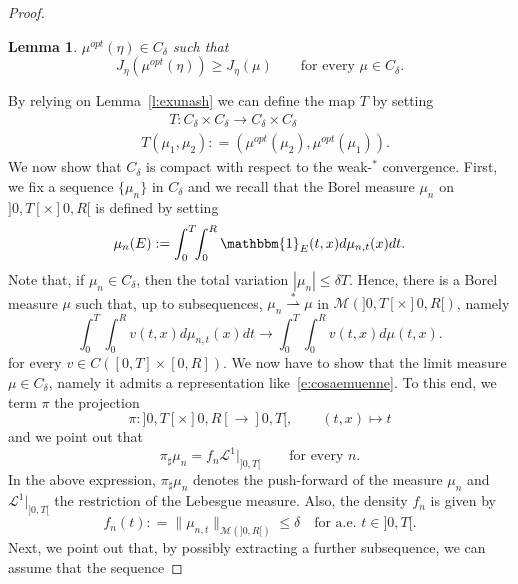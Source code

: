 \documentclass[11pt,leqno]{amsart}
\newtheorem{lemma}[theorem]{Lemma}
\numberwithin{equation}{section}
\begin{document}
\begin{proof}
\begin{lemma}
$\mu^{opt} (\eta) \in C_\delta$ such that 
\begin{equation}
  \label{e:N:opt}
  J_\eta (\mu^{opt}(\eta) ) \ge J_\eta (\mu) 
  \qquad \text{for every $\mu \in C_\delta$}.  
\end{equation}
\end{lemma}
By relying on Lemma~\ref{l:exunash} we can define the map $T$ by setting 
\begin{equation}
\label{e:N:T}
\begin{split}  
      & \quad \quad T: C_\delta \times C_\delta \to 
      C_\delta \times C_\delta \\
      &
      T(\mu_1, \mu_2) : = \left(\mu^{opt}(\mu_2) , \mu^{opt}(\mu_1) \right). 
\end{split}
\end{equation} 
We now show that $C_\delta$ is compact with respect to the weak-$^\ast$ convergence. First, we fix a sequence $\{ \mu_n \} $ in $C_\delta$ and we recall that the Borel measure $\mu_n$ 
on $]0,T[ \times ]0,R[$ is defined by setting
\begin{equation}
\label{e:cosaemuenne}
  \mu_{n} (E) : = \int_0^T \! \! \int_0^R  
    \mathbbm{1}_E (t, x) d \mu_{n,t} (x) dt.
\end{equation}
Note that, if $\mu_n \in C_\delta$, then the total variation $|\mu_n | \leq \delta T$. Hence, there is a Borel measure $\mu$ such that, up to subsequences, $\mu_n {\stackrel{*}{\rightharpoonup}} \mu$ in $\mathcal M (]0, T[ \times ]0, R[)$, namely 
$$
   \int_0^T \! \! \int_0^R  
   v (t, x) d \mu_{n, t} (x) dt \to 
   \int_0^T \! \! \int_0^R  
   v (t, x) d \mu (t, x) .
$$
for every $v \in C\left([0,T] \times [0,R]\right)$.
We now have to show that the limit measure $\mu \in C_\delta$, namely it admits a representation like~\eqref{e:cosaemuenne}.  To this end, we term $\pi$ the projection 
$$
    \pi : ]0, T[ \times ]0, R[ \to ]0, T[, \qquad (t, x) \mapsto t
$$
and we point out that
\begin{equation}
\label{e:project}
   \pi_\sharp \mu_n = f_n \mathcal  L^1 \big|_{]0, T[} \qquad \text{for every $n$}.
\end{equation}
In the above expression, $\pi_\sharp \mu_n$ denotes the push-forward of the measure $\mu_n$ and $\mathcal L^1 \big|_{]0, T[} $ the restriction of the Lebesgue measure. Also, the density $f_n$ is given by 
$$
    f_n (t) : = \| \mu_{ n, t} \|_{\mathcal M(]0, R[)} \leq \delta \quad \text{for a.e. $t \in ]0, T[$}.    
$$ 
Next, we point out that, by possibly extracting a further subsequence, we can assume that the sequence

\end{proof}
\end{document}

